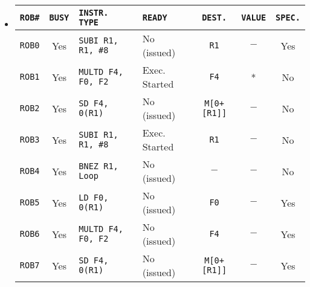 \begin{examplebox}
\begin{itemize}
        \item {}
        \begin{center}
            \begin{adjustbox}{width={.92\textwidth},totalheight={\textheight},keepaspectratio}
                \begin{tabular}{@{} c | c | l | l | c | c | c @{}}
                    \toprule
                    \texttt{ROB\#}      & \texttt{BUSY}     & \texttt{INSTR. TYPE}      & \texttt{READY}        & \texttt{DEST.}        & \texttt{VALUE}        & \texttt{SPEC.}    \\
                    \midrule
                    \texttt{ROB0}       & Yes               & \texttt{SUBI R1, R1, \#8} & No (issued)           & \texttt{R1}           & $-$                   & Yes               \\ [.3em]
                    \texttt{ROB1}       & Yes               & \texttt{MULTD F4, F0, F2} & Exec. Started         & \texttt{F4}           & *                     & No                \\ [.3em]
                    \texttt{ROB2}       & Yes               & \texttt{SD F4, 0(R1)}     & No (issued)           & \texttt{M[0+[R1]]}    & $-$                   & No                \\ [.3em]
                    \texttt{ROB3}       & Yes               & \texttt{SUBI R1, R1, \#8} & Exec. Started         & \texttt{R1}           & $-$                   & No                \\ [.3em]
                    \texttt{ROB4}       & Yes               & \texttt{BNEZ R1, Loop}    & No (issued)           & $-$                   & $-$                   & No                \\ [.3em]
                    \texttt{ROB5}       & Yes               & \texttt{LD F0, 0(R1)}     & No (issued)           & \texttt{F0}           & $-$                   & Yes               \\ [.3em]
                    \texttt{ROB6}       & Yes               & \texttt{MULTD F4, F0, F2} & No (issued)           & \texttt{F4}           & $-$                   & Yes               \\ [.3em]
                    \texttt{ROB7}       & Yes               & \texttt{SD F4, 0(R1)}     & No (issued)           & \texttt{M[0+[R1]]}    & $-$                   & Yes               \\
                    \bottomrule
                \end{tabular}

\end{adjustbox}
\end{center}
\end{itemize}
\end{examplebox}
